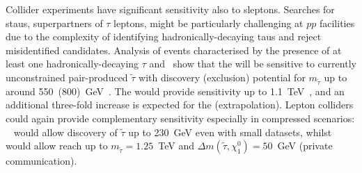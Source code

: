 \documentclass[../report.tex]{subfiles}
\begin{document}
 
Collider experiments have significant sensitivity also to sleptons. Searches for staus, superpartners of $\tau$ leptons, might be particularly challenging at $pp$ facilities due to the complexity of identifying hadronically-decaying taus and reject misidentified candidates. Analysis of events characterised by the presence of at least one hadronically-decaying $\tau$ and \Ptmiss~show that the \HLLHC will be sensitive to currently unconstrained pair-produced $\tilde{\tau}$ with discovery (exclusion) potential for $m_{\tilde{\tau}}$ up to around 550~(800)~GeV~\cite{CidVidal:2018eel}. The \HELHC would provide sensitivity up to 1.1~TeV~\cite{CidVidal:2018eel}, and an additional three-fold increase is expected for the \FCChh (extrapolation). 
Lepton colliders could again provide complementary sensitivity especially in compressed scenarios: \ILCFiveHundred~\cite{Antusch:2017pkq} would allow discovery of $\tilde{\tau}$ up to 230~GeV even with small datasets, whilst  \CLICThreeThousand would allow reach up to $m_{\tilde{\tau}}=1.25$~TeV and $\Delta m(\tilde{\tau},\chi_1^0)=50$~GeV (private communication). 
\end{document}
